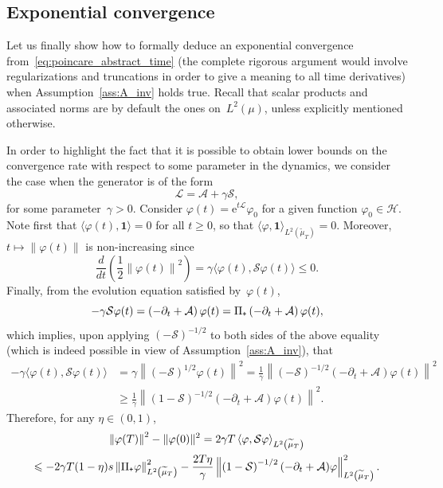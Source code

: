 \documentclass[10pt]{amsart}
\theoremstyle{definition}\newtheorem{defi}[theo]{Definition}\newtheorem{rema}[theo]{Remark}\newtheorem{exam}[theo]{Example}\newtheorem{exem}[theo]{Example}\newtheorem{nota}[theo]{Notation}
\newcommand{\rme}{\mathrm{e}}
\newcommand{\cL}{\mathcal{L}}
\newcommand{\cLs}{\mathcal{S}}
\newcommand{\cLa}{\mathcal{A}}
\newcommand{\cH}{\mathcal{H}}
\newcommand{\bfun}{\mathbf{1}}
\newcommand{\subplus}{\textnormal{\texttt{+}}}
\renewcommand{\leq}{\leqslant}
\renewcommand{\geq}{\geqslant}
\begin{document}
\subsection{Exponential convergence}
Let us finally show how to formally deduce an exponential convergence from~\eqref{eq:poincare_abstract_time} (the complete rigorous argument would involve regularizations and truncations in order to give a meaning to all time derivatives) when Assumption~\ref{ass:A_inv} holds true. Recall that scalar products and associated norms are by default the ones on~$L^2(\mu)$, unless explicitly mentioned otherwise.

In order to highlight the fact that it is possible to obtain lower bounds on the convergence rate with respect to some parameter in the dynamics, we consider the case when the generator is of the form
\[
\cL = \cLa + \gamma \cLs,
\]
for some parameter~$\gamma > 0$. Consider $\varphi(t) = \rme^{t \cL} \varphi_0$ for a given function $\varphi_0 \in \cH$. Note first that $\langle \varphi(t),\bfun\rangle = 0$ for all $t \geq 0$, so that $\langle \varphi,\bfun\rangle_{L^2(\widetilde{\mu}_T)} = 0$. Moreover, $t \mapsto \|\varphi(t)\|$ is non-increasing since
\[
\frac{d}{dt}\left(\frac12 \left\|\varphi(t)\right\|^2\right) = \gamma \big\langle\varphi(t),\cLs\varphi(t)\big\rangle \leq 0.
\]
Finally, from the evolution equation satisfied by~$\varphi(t)$,
\[
-\gamma \cLs \varphi(t) = \left(-\partial_t + \cLa\right) \varphi(t) = \Pi_\subplus\left(-\partial_t + \cLa\right) \varphi(t),
\]
which implies, upon applying $(-\cLs)^{-1/2}$ to both sides of the above equality (which is indeed possible in view of Assumption~\ref{ass:A_inv}), that
\begin{align*}
-\gamma \big\langle\varphi(t),\cLs\varphi(t)\big\rangle & = \gamma \left\| (-\cLs)^{1/2} \varphi(t) \right\|^2 = \frac1\gamma \left\| (-\cLs)^{-1/2}(-\partial_t + \cLa)\varphi(t)\right\|^2\\
& \geq \frac1\gamma \left\| (1-\cLs)^{-1/2}(-\partial_t + \cLa)\varphi(t)\right\|^2.
\end{align*}
Therefore, for any $\eta \in (0,1)$,
\begin{multline*}
\left\|\varphi(T)\right\|^2 - \|\varphi(0)\|^2 = 2\gamma T \left\langle\varphi,\cLs\varphi \right\rangle_{L^2\left(\widetilde{\mu}_T\right)} \\
\leq - 2\gamma T(1-\eta)s \left\| \Pi_\subplus \varphi \right\|_{L^2\left(\widetilde{\mu}_T\right)}^2 - \frac{2T\eta}{\gamma} \left\| \left(1-\cLs\right)^{-1/2}(-\partial_t + \cLa) \varphi \right\|_{L^2\left(\widetilde{\mu}_T\right)}^2.
\end{multline*}
\end{document}
